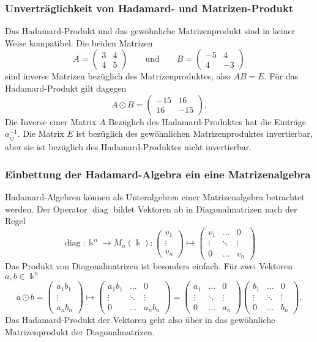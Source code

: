 \subsubsection{Unverträglichkeit von Hadamard- und Matrizen-Produkt}
Das Hadamard-Produkt und das gewöhnliche Matrizenprodukt sind
in keiner Weise kompatibel.
Die beiden Matrizen 
\[
A=\begin{pmatrix}3&4\\4&5\end{pmatrix}
\qquad\text{und}\qquad
B=\begin{pmatrix}-5&4\\4&-3\end{pmatrix}
\]
sind inverse Matrizen bezüglich des Matrizenproduktes, also
$AB=E$.
Für das Hadamard-Produkt gilt dagegen
\[
A\odot B
=
\begin{pmatrix}
-15& 16\\
 16&-15
\end{pmatrix}.
\]
Die Inverse einer Matrix $A$ Bezüglich des Hadamard-Produktes hat
die Einträge $a_{ij}^{-1}$.
Die Matrix $E$ ist bezüglich des gewöhnlichen Matrizenproduktes
invertierbar, aber sie ist bezüglich des Hadamard-Produktes nicht
invertierbar.

\subsubsection{Einbettung der Hadamard-Algebra ein eine Matrizenalgebra}
Hadamard-Algebren können als Unteralgebren einer Matrizenalgebra
betrachtet werden.
Der Operator $\operatorname{diag}$ bildet Vektoren ab in Diagonalmatrizen
nach der Regel
\[
\operatorname{diag}
\colon
\Bbbk^n \to M_n(\Bbbk)
:
\begin{pmatrix}
v_1\\
\vdots\\
v_n
\end{pmatrix}
\mapsto
\begin{pmatrix}
v_1&\dots&0\\
\vdots&\ddots&\vdots\\
0&\dots&v_n
\end{pmatrix}
\]
Das Produkt von Diagonalmatrizen ist besonders einfach.
Für zwei Vektoren $a,b\in\Bbbk^n$ 
\[
a\odot b
=
\begin{pmatrix}
a_1b_1\\
\vdots\\
a_nb_n
\end{pmatrix}
\mapsto
\begin{pmatrix}
a_1b_1&\dots&0\\
\vdots&\ddots&\vdots\\
0&\dots&a_nb_n
\end{pmatrix}
=
\begin{pmatrix}
a_1&\dots&0\\
\vdots&\ddots&\vdots\\
0&\dots&a_n
\end{pmatrix}
\begin{pmatrix}
b_1&\dots&0\\
\vdots&\ddots&\vdots\\
0&\dots&b_n
\end{pmatrix}.
\]
Das Hadamard-Produkt der Vektoren geht also über in das gewöhnliche
Matrizenprodukt der Diagonalmatrizen.

